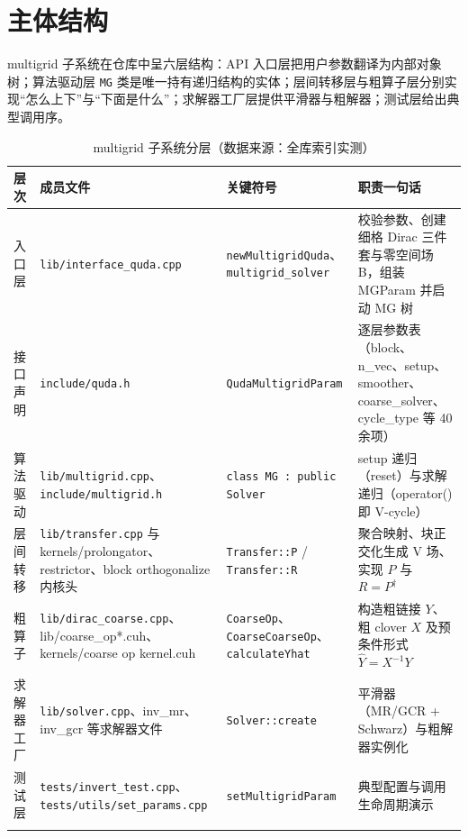 \documentclass[UTF8]{ctexart}
\begin{document}
\section{主体结构}

multigrid 子系统在仓库中呈六层结构：API 入口层把用户参数翻译为内部对象树；算法驱动层 \texttt{MG} 类是唯一持有递归结构的实体；层间转移层与粗算子层分别实现``怎么上下''与``下面是什么''；求解器工厂层提供平滑器与粗解器；测试层给出典型调用序。

\begin{xltabular}{\textwidth}{lp{3.0cm}p{3.6cm}X}
\toprule
\textcolor{struct}{层次} & 成员文件 & 关键符号 & \textcolor{struct}{职责一句话} \\
\midrule
\endhead
入口层 & \texttt{\nolinkurl{lib/interface_quda.cpp}} & \texttt{\nolinkurl{newMultigridQuda}}、\texttt{\nolinkurl{multigrid_solver}} & 校验参数、创建细格 Dirac 三件套与零空间场 B，组装 MGParam 并启动 MG 树 \\
接口声明 & \texttt{\nolinkurl{include/quda.h}} & \texttt{\nolinkurl{QudaMultigridParam}} & 逐层参数表（block、n\_vec、setup、smoother、coarse\_solver、cycle\_type 等 40 余项） \\
算法驱动 & \texttt{\nolinkurl{lib/multigrid.cpp}}、\texttt{\nolinkurl{include/multigrid.h}} & \texttt{class MG : public Solver} & setup 递归（reset）与求解递归（operator() 即 V-cycle） \\
层间转移 & \texttt{\nolinkurl{lib/transfer.cpp}} 与 kernels/prolongator、restrictor、block orthogonalize 内核头 & \texttt{\nolinkurl{Transfer::P}} / \texttt{\nolinkurl{Transfer::R}} & 聚合映射、块正交化生成 V 场、实现 $P$ 与 $R=P^\dagger$ \\
粗算子 & \texttt{\nolinkurl{lib/dirac_coarse.cpp}}、lib/coarse\_op*.cuh、kernels/coarse op kernel.cuh & \texttt{\nolinkurl{CoarseOp}}、\texttt{\nolinkurl{CoarseCoarseOp}}、\texttt{\nolinkurl{calculateYhat}} & 构造粗链接 $Y$、粗 clover $X$ 及预条件形式 $\hat Y=X^{-1}Y$ \\
求解器工厂 & \texttt{\nolinkurl{lib/solver.cpp}}、inv\_mr、inv\_gcr 等求解器文件 & \texttt{\nolinkurl{Solver::create}} & 平滑器（MR/GCR + Schwarz）与粗解器实例化 \\
测试层 & \texttt{\nolinkurl{tests/invert_test.cpp}}、\texttt{\nolinkurl{tests/utils/set_params.cpp}} & \texttt{\nolinkurl{setMultigridParam}} & 典型配置与调用生命周期演示 \\
\bottomrule
\caption{multigrid 子系统分层（数据来源：全库索引实测）}
\end{xltabular}
\end{document}
